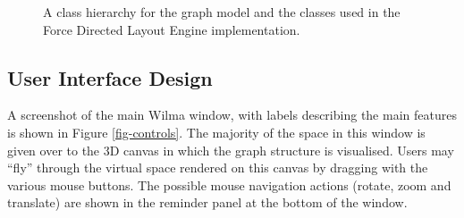\documentclass[runningheads]{cl2emult}
\begin{document}
\begin{figure}[h]
  \centering
  \caption{A class hierarchy for the graph model and the classes used
  in the Force Directed Layout Engine implementation.}
\end{figure}

\subsection{User Interface Design}
A screenshot of the main Wilma window, with labels describing the main
features is shown in Figure \ref{fig-controls}.
The majority of the space in this window is given over to the 3D
canvas in which the graph structure is visualised.  Users may ``fly''
through the virtual space rendered on this canvas by dragging with the
various mouse buttons.  The possible mouse navigation actions (rotate,
zoom and translate) are
shown in the reminder panel at the bottom of the window.
\end{document}
